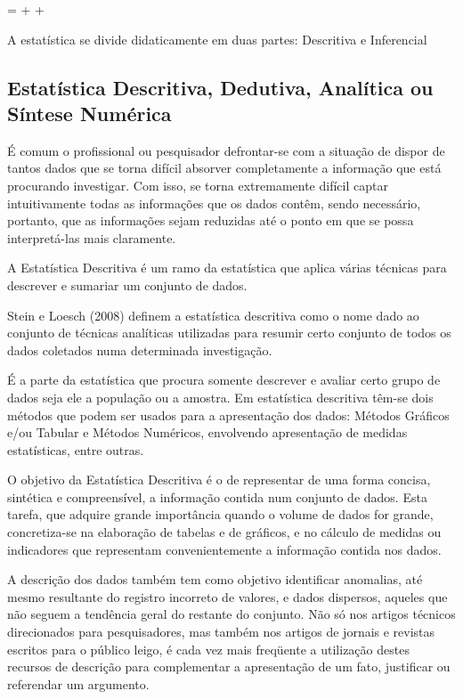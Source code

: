 \begin{center}
 =  +  + 
\end{center}

A estatística se divide didaticamente em duas partes: Descritiva e Inferencial


\subsection{Estatística Descritiva, Dedutiva, Analítica ou Síntese Numérica}

\inic É comum o profissional ou pesquisador defrontar-se com a situação de dispor de tantos dados que se torna difícil absorver completamente a informação que está procurando investigar. Com isso, se torna extremamente difícil captar intuitivamente todas as informações que os dados contêm, sendo necessário, portanto, que as informações sejam reduzidas até o ponto em que se possa interpretá-las mais claramente.\vskip0.3cm



A Estatística Descritiva é um ramo da estatística que aplica várias técnicas para descrever e sumariar um conjunto de dados.\vskip0.3cm

Stein e Loesch (2008) definem a estatística descritiva como o nome dado ao conjunto de técnicas analíticas utilizadas para resumir certo conjunto de todos os dados coletados numa determinada investigação.\vskip0.3cm


É a parte da estatística que procura somente descrever e avaliar certo grupo de dados seja ele a população ou a amostra. Em estatística descritiva têm-se dois métodos que podem ser usados para a apresentação dos dados: Métodos Gráficos e/ou Tabular e Métodos Numéricos, envolvendo apresentação de medidas estatísticas, entre outras.\vskip0.3cm



O objetivo da Estatística Descritiva é o de representar de uma forma concisa, sintética e compreensível, a informação contida num conjunto de dados. Esta tarefa, que adquire grande importância quando o volume de dados for grande, concretiza-se na elaboração de tabelas e de gráficos, e no cálculo de medidas ou indicadores que representam convenientemente a informação contida nos dados.\vskip0.3cm


 A descrição dos dados também tem como objetivo identificar anomalias, até mesmo resultante do registro incorreto de valores, e dados dispersos, aqueles que não seguem a tendência geral do restante do conjunto. Não só nos artigos técnicos direcionados para pesquisadores, mas também nos artigos de jornais e revistas escritos para o público leigo, é cada vez mais freqüente a utilização destes recursos de descrição para complementar a apresentação de um fato, justificar ou referendar um
 argumento.\vskip0.3cm



